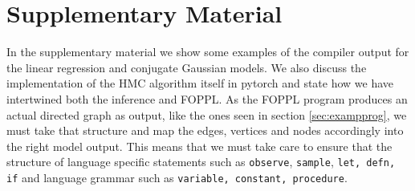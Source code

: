 \documentclass[twoside]{article}
\begin{document}
\section{Supplementary Material}
\label{sec:supmat}

In the supplementary material we show some examples of the compiler output for the linear regression and conjugate Gaussian models. We also discuss the implementation of the HMC algorithm itself in pytorch and state how we have intertwined both the inference and FOPPL. As the FOPPL program produces an actual directed graph as output, like the ones seen in section \ref{sec:exampprog},  we must take that structure and map the edges, vertices and nodes accordingly into the right model output. This means that we must take care to ensure that the structure of language specific statements such as \texttt{observe}, \texttt{sample}, \texttt{let, defn, if} and language grammar such as \texttt{variable, constant, procedure}. 
\inputminted{python}{code/cjgauss.py}
\inputminted{python}{code/lr_out.py}
\inputminted{python}{code/hmc_class.py}
\inputminted{python}{code/cjgauss.py}

\end{document}
